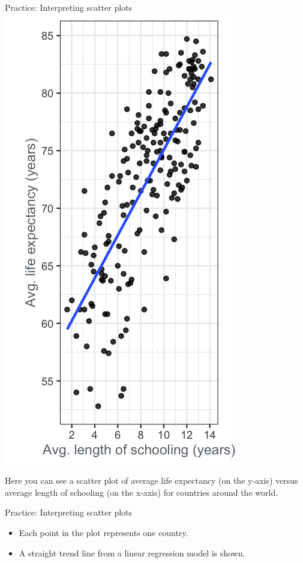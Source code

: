 \documentclass[
  ignorenonframetext,
]{beamer}
\begin{document}
\begin{frame}{Practice: Interpreting scatter plots}
\label{practice-interpreting-scatter-plots-1}
\includegraphics{../images/im40.png}

Here you can see a scatter plot of average life expectancy (on the
y-axis) versus average length of schooling (on the x-axis) for countries
around the world.
\end{frame}

\begin{frame}{Practice: Interpreting scatter plots}
\label{practice-interpreting-scatter-plots-2}
\begin{itemize}
\item
  Each point in the plot represents one country.
\item
  A straight trend line from a linear regression model is shown.
\end{itemize}
\end{frame}
\end{document}
